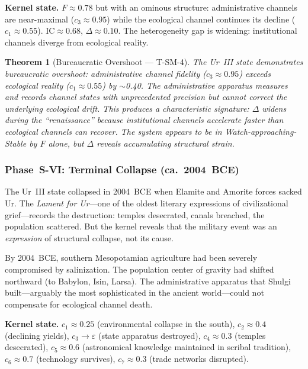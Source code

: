 \documentclass[
  aps,
  prd,
  twocolumn,
  superscriptaddress,
  nofootinbib,
  floatfix
]{revtex4-2}
\newtheorem{theorem}{Theorem}
\newcommand{\eps}{\varepsilon}
\newcommand{\IC}{\mathrm{IC}}
\begin{document}
\textbf{Kernel state.}  $F \approx 0.78$ but with an
ominous structure: administrative channels are
near-maximal ($c_3 \approx 0.95$) while the
ecological channel continues its decline ($c_1
\approx 0.55$).  $\IC \approx 0.68$, $\Delta
\approx 0.10$.  The heterogeneity gap is widening:
institutional channels diverge from ecological
reality.

\begin{theorem}[Bureaucratic Overshoot ---
T-SM-4]\label{thm:bureaucracy}
The Ur~III state demonstrates bureaucratic overshoot:
administrative channel fidelity ($c_3 \approx 0.95$)
exceeds ecological reality ($c_1 \approx 0.55$) by
$\sim$0.40.  The administrative apparatus measures
and records channel states with unprecedented
precision but cannot correct the underlying ecological
drift.  This produces a characteristic signature:
$\Delta$ \emph{widens} during the ``renaissance''
because institutional channels accelerate faster
than ecological channels can recover.  The system
appears to be in Watch-approaching-Stable by $F$
alone, but $\Delta$ reveals accumulating structural
strain.
\end{theorem}


\subsubsection{Phase~S-VI: Terminal Collapse
(ca.\ 2004~BCE)}\label{sec:uriii-collapse}

The Ur~III state collapsed in 2004~BCE when Elamite
and Amorite forces sacked Ur.  The \emph{Lament for
Ur}---one of the oldest literary expressions of
civilizational grief---records the destruction:
temples desecrated, canals breached, the population
scattered.  But the kernel reveals that the military
event was an \emph{expression} of structural collapse,
not its cause.

By 2004~BCE, southern Mesopotamian agriculture had
been severely compromised by salinization.  The
population center of gravity had shifted northward
(to Babylon, Isin, Larsa).  The administrative
apparatus that Shulgi built---arguably the most
sophisticated in the ancient world---could not
compensate for ecological channel death.

\textbf{Kernel state.}  $c_1 \approx 0.25$
(environmental collapse in the south), $c_2
\approx 0.4$ (declining yields), $c_3 \to \eps$
(state apparatus destroyed), $c_4 \approx 0.3$
(temples desecrated), $c_5 \approx 0.6$
(astronomical knowledge maintained in scribal
tradition), $c_6 \approx 0.7$ (technology survives),
$c_7 \approx 0.3$ (trade networks disrupted).
\end{document}
